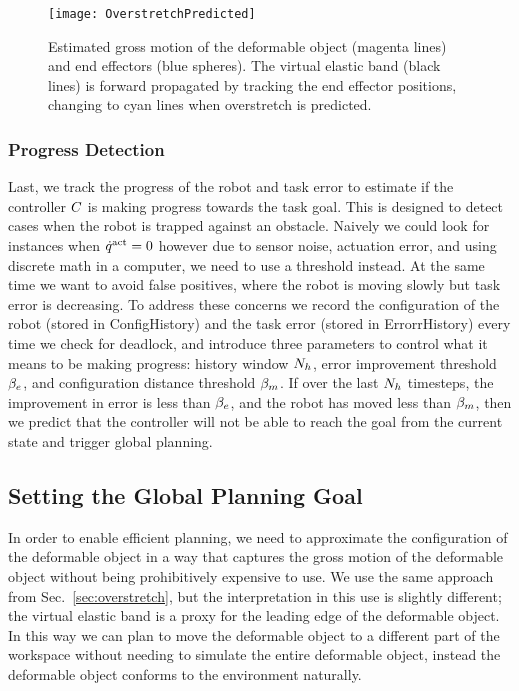 \begin{figure}[ht]
    \centering
    \texttt{[image: OverstretchPredicted]}
    \caption{Estimated gross motion of the deformable object (magenta lines) and end effectors (blue spheres). The virtual elastic band (black lines) is forward propagated by tracking the end effector positions, changing to cyan lines when overstretch is predicted.}
    \label{fig:overstretch_predicted}
\end{figure}







\subsubsection{Progress Detection}

Last, we track the progress of the robot and task error to estimate if the controller $C$ is making progress towards the task goal. This is designed to detect cases when the robot is trapped against an obstacle. Naively we could look for instances when $\dot{q}^{\textrm{act}} = 0$ however due to sensor noise, actuation error, and using discrete math in a computer, we need to use a threshold instead. At the same time we want to avoid false positives, where the robot is moving slowly but task error is decreasing. To address these concerns we record the configuration of the robot (stored in ConfigHistory) and the task error (stored in ErrorrHistory) every time we check for deadlock, and introduce three parameters to control what it means to be making progress: history window $N_h$, error improvement threshold $\beta_e$, and configuration distance threshold $\beta_m$. If over the last $N_h$ timesteps, the improvement in error is less than $\beta_e$, and the robot has moved less than $\beta_m$, then we predict that the controller will not be able to reach the goal from the current state and trigger global planning.



\subsection{Setting the Global Planning Goal}
\label{sec:planning_goal}


In order to enable efficient planning, we need to approximate the configuration of the deformable object in a way that captures the gross motion of the deformable object without being prohibitively expensive to use. We use the same approach from Sec.~\ref{sec:overstretch}, but the interpretation in this use is slightly different; the virtual elastic band is a proxy for the leading edge of the deformable object. In this way we can plan to move the deformable object to a different part of the workspace without needing to simulate the entire deformable object, instead the deformable object conforms to the environment naturally.



